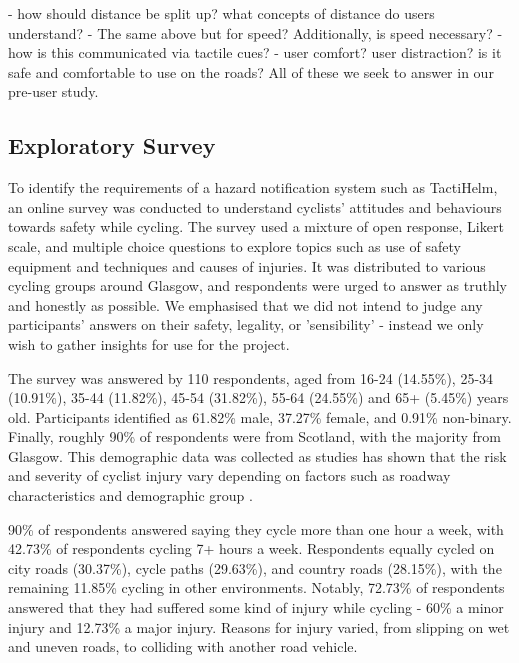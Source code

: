 \documentclass{interim}
\begin{document}
- how should distance be split up? what concepts of distance do users understand?
- The same above but for speed? Additionally, is speed necessary?
- how is this communicated via tactile cues?
- user comfort? user distraction? is it safe and comfortable to use on the roads?
All of these we seek to answer in our pre-user study.

\subsection{Exploratory Survey}\label{sec:survey}
To identify the requirements of a hazard notification system such as TactiHelm, an online survey was conducted to understand cyclists' attitudes and behaviours towards safety while cycling. The survey used a mixture of open response, Likert scale, and multiple choice questions to explore topics such as use of safety equipment and techniques and causes of injuries. It was distributed to various cycling groups around Glasgow, and respondents were urged to answer as truthly and honestly as possible. We emphasised that we did not intend to judge any participants' answers on their safety, legality, or 'sensibility' - instead we only wish to gather insights for use for the project.

The survey was answered by 110 respondents, aged from 16-24 (14.55\%), 25-34 (10.91\%), 35-44 (11.82\%), 45-54 (31.82\%), 55-64 (24.55\%) and 65+ (5.45\%) years old. Participants identified as 61.82\% male, 37.27\% female, and 0.91\% non-binary. Finally, roughly 90\% of respondents were from Scotland, with the majority from Glasgow. This demographic data was collected as studies has shown that the risk and severity of cyclist injury vary depending on factors such as roadway characteristics and demographic group \cite{BEHNOOD201735}.

90\% of respondents answered saying they cycle more than one hour a week, with 42.73\% of respondents cycling 7+ hours a week. Respondents equally cycled on city roads (30.37\%), cycle paths (29.63\%), and country roads (28.15\%), with the remaining 11.85\% cycling in other environments. Notably, 72.73\% of respondents answered that they had suffered some kind of injury while cycling - 60\% a minor injury and 12.73\% a major injury. Reasons for injury varied, from slipping on wet and uneven roads, to colliding with another road vehicle.
\end{document}
